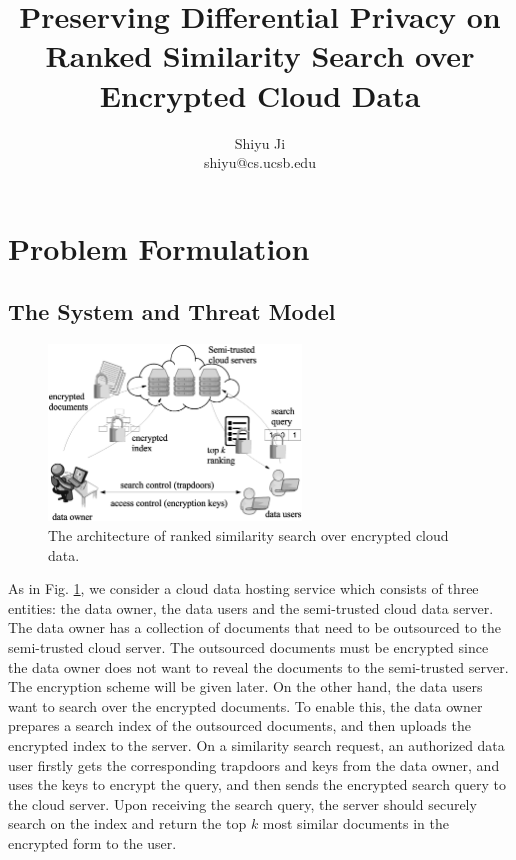 \documentclass{article}
\begin{document}
\title{\Large\bf Preserving Differential Privacy on Ranked Similarity Search over Encrypted Cloud Data}
\author{Shiyu Ji\\ shiyu@cs.ucsb.edu}
\date{}
\maketitle

\newtheorem{definition}{Definition}
\theoremstyle{definition}
\newtheorem{theorem}{Theorem}
\theoremstyle{plain}
\newtheorem{lemma}{Lemma}
\theoremstyle{plain}
\newtheorem{corollary}{Corollary}
\theoremstyle{plain}

\section{Problem Formulation}
\subsection{The System and Threat Model}

\begin{figure}
\centering
\includegraphics[width=0.6\textwidth]{system_model.eps}
\caption{The architecture of ranked similarity search over encrypted cloud data.}
\label{fig:system_model}
\end{figure}

As in Fig. \ref{fig:system_model}, we consider a cloud data hosting service which consists of three entities: the data owner, the data users and the semi-trusted cloud data server. The data owner has a collection of documents that need to be outsourced to the semi-trusted cloud server. The outsourced documents must be encrypted since the data owner does not want to reveal the documents to the semi-trusted server. The encryption scheme will be given later. On the other hand, the data users want to search over the encrypted documents. To enable this, the data owner prepares a search index of the outsourced documents, and then uploads the encrypted index to the server. On a similarity search request, an authorized data user firstly gets the corresponding trapdoors and keys from the data owner, and uses the keys to encrypt the query, and then sends the encrypted search query to the cloud server. Upon receiving the search query, the server should securely search on the index and return the top $k$ most similar documents in the encrypted form to the user.
\end{document}
